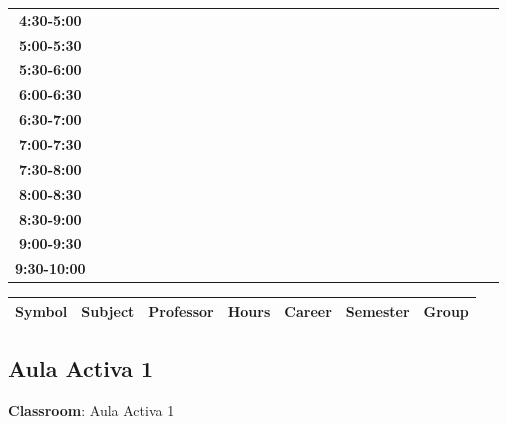 \documentclass{article}
\begin{document}
\begin{table}[ht]
\begin{tabular}{|c|c|c|c|c|c|c|c|c|c|c|c|c|c|c|c|c|c|c|c|c|c|c|c|c|c|c|c|c|c|}
 \cline{1-8} 
\textbf{4:30-5:00} &   &   &   &   &   &   &   \\
 \cline{1-8} 
\textbf{5:00-5:30} &   &   &   &   &   &   &   \\
 \cline{1-8} 
\textbf{5:30-6:00} &   &   &   &   &   &   &   \\
 \cline{1-8} 
\textbf{6:00-6:30} &   &   &   &   &   &   &   \\
 \cline{1-8} 
\textbf{6:30-7:00} &   &   &   &   &   &   &   \\
 \cline{1-8} 
\textbf{7:00-7:30} &   &   &   &   &   &   &   \\
 \cline{1-8} 
\textbf{7:30-8:00} &   &   &   &   &   &   &   \\
 \cline{1-8} 
\textbf{8:00-8:30} &   &   &   &   &   &   &   \\
 \cline{1-8} 
\textbf{8:30-9:00} &   &   &   &   &   &   &   \\
 \cline{1-8} 
\textbf{9:00-9:30} &   &   &   &   &   &   &   \\
 \cline{1-8} 
\textbf{9:30-10:00} &   &   &   &   &   &   &   \\
 \cline{1-8} 
\end{tabular}\end{table}

        
        \begin{tabular}{|>{\centering\arraybackslash}m{2cm}|>{\centering\arraybackslash}m{4cm}|>{\centering\arraybackslash}m{2.15cm}|>{\centering\arraybackslash}m{1.8cm}|>{\centering\arraybackslash}m{2cm}|>{\centering\arraybackslash}m{2cm}|>{\centering\arraybackslash}m{2cm}|}
        \hline
        \textbf{Symbol} & \textbf{Subject} & \textbf{Professor} & \textbf{Hours} & \textbf{Career} & \textbf{Semester} & \textbf{Group} \\
        \hline
        \end{tabular}
                    

        \newpage
        

        \subsection{Aula Activa 1}
        \vspace*{.1cm}
        
        \begin{flushright}
            {\LARGE \textbf{Classroom}: Aula Activa 1}
        \end{flushright}
        \vspace{1cm}
\end{document}
